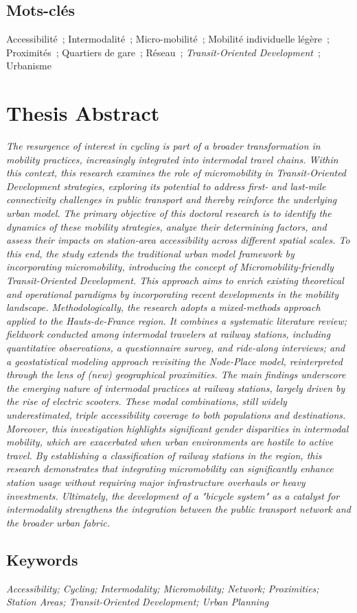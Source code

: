 {%
\subsection*{Mots-clés}

\noindent
Accessibilité~; Intermodalité~; Micro-mobilité~; Mobilité individuelle légère~; Proximités~; Quartiers de gare~; Réseau~; \textit{Transit-Oriented Development}~; Urbanisme

\section*{Thesis Abstract}

\footnotesize{\textsl{The resurgence of interest in cycling is part of a broader transformation in mobility practices, increasingly integrated into intermodal travel chains. Within this context, this research examines the role of micromobility in Transit-Oriented Development strategies, exploring its potential to address first- and last-mile connectivity challenges in public transport and thereby reinforce the underlying urban model. The primary objective of this doctoral research is to identify the dynamics of these mobility strategies, analyze their determining factors, and assess their impacts on station-area accessibility across different spatial scales. To this end, the study extends the traditional urban model framework by incorporating micromobility, introducing the concept of Micromobility-friendly Transit-Oriented Development. This approach aims to enrich existing theoretical and operational paradigms by incorporating recent developments in the mobility landscape. Methodologically, the research adopts a mixed-methods approach applied to the Hauts-de-France region. It combines a systematic literature review; fieldwork conducted among intermodal travelers at railway stations, including quantitative observations, a questionnaire survey, and ride-along interviews; and a geostatistical modeling approach revisiting the Node-Place model, reinterpreted through the lens of (new) geographical proximities. The main findings underscore the emerging nature of intermodal practices at railway stations, largely driven by the rise of electric scooters. These modal combinations, still widely underestimated, triple accessibility coverage to both populations and destinations. Moreover, this investigation highlights significant gender disparities in intermodal mobility, which are exacerbated when urban environments are hostile to active travel. By establishing a classification of railway stations in the region, this research demonstrates that integrating micromobility can significantly enhance station usage without requiring major infrastructure overhauls or heavy investments. Ultimately, the development of a "bicycle system" as a catalyst for intermodality strengthens the integration between the public transport network and the broader urban fabric.
    }}

\subsection*{Keywords}

\noindent
\textsl{Accessibility; Cycling; Intermodality; Micromobility; Network; Proximities; Station Areas; Transit-Oriented Development; Urban Planning}
}